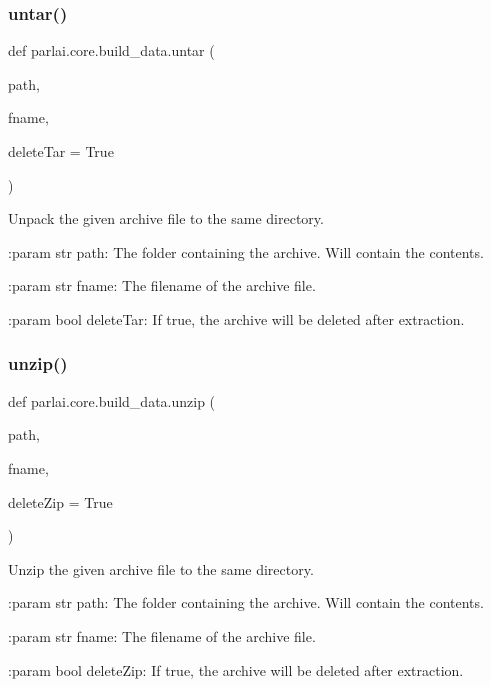 \subsubsection{\texorpdfstring{untar()}{untar()}}
{\footnotesize\ttfamily def parlai.\+core.\+build\+\_\+data.\+untar (\begin{DoxyParamCaption}\item[{}]{path,  }\item[{}]{fname,  }\item[{}]{delete\+Tar = {\ttfamily True} }\end{DoxyParamCaption})}

\begin{DoxyVerb}Unpack the given archive file to the same directory.

:param str path:
    The folder containing the archive. Will contain the contents.

:param str fname:
    The filename of the archive file.

:param bool deleteTar:
    If true, the archive will be deleted after extraction.
\end{DoxyVerb}
 \mbox{\label{namespaceparlai_1_1core_1_1build__data_a7cbfdf246ca40dc3ed9f8613deb14a00}} 
\subsubsection{\texorpdfstring{unzip()}{unzip()}}
{\footnotesize\ttfamily def parlai.\+core.\+build\+\_\+data.\+unzip (\begin{DoxyParamCaption}\item[{}]{path,  }\item[{}]{fname,  }\item[{}]{delete\+Zip = {\ttfamily True} }\end{DoxyParamCaption})}

\begin{DoxyVerb}Unzip the given archive file to the same directory.

:param str path:
    The folder containing the archive. Will contain the contents.

:param str fname:
    The filename of the archive file.

:param bool deleteZip:
    If true, the archive will be deleted after extraction.
\end{DoxyVerb}
 